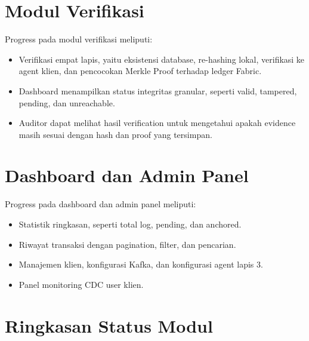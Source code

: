 \section{Modul Verifikasi}

Progress pada modul verifikasi meliputi:

\begin{itemize}
    \item Verifikasi empat lapis, yaitu eksistensi database, re-hashing lokal, verifikasi ke agent klien, dan pencocokan Merkle Proof terhadap ledger Fabric.
    \item Dashboard menampilkan status integritas granular, seperti valid, tampered, pending, dan unreachable.
    \item Auditor dapat melihat hasil verification untuk mengetahui apakah evidence masih sesuai dengan hash dan proof yang tersimpan.
\end{itemize}

\section{Dashboard dan Admin Panel}

Progress pada dashboard dan admin panel meliputi:

\begin{itemize}
    \item Statistik ringkasan, seperti total log, pending, dan anchored.
    \item Riwayat transaksi dengan pagination, filter, dan pencarian.
    \item Manajemen klien, konfigurasi Kafka, dan konfigurasi agent lapis 3.
    \item Panel monitoring CDC user klien.
\end{itemize}



\section{Ringkasan Status Modul}

